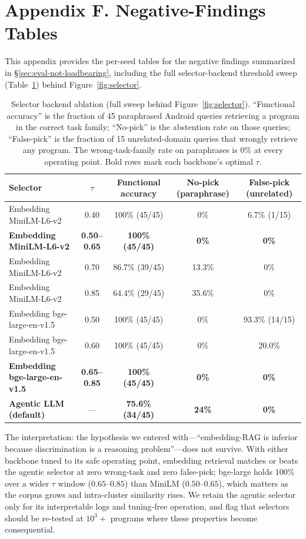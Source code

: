 \documentclass[11pt]{article}
\begin{document}
\section*{Appendix F. Negative-Findings Tables}
\label{sec:eval-selector-ablation}

This appendix provides the per-seed tables for the negative findings summarized in \S\ref{sec:eval-not-loadbearing}, including the full selector-backend threshold sweep (Table~\ref{tab:selector-ablation}) behind Figure~\ref{fig:selector}.

\begin{table}[h]
\centering
\caption{Selector backend ablation (full sweep behind Figure~\ref{fig:selector}). ``Functional accuracy'' is the fraction of 45 paraphrased Android queries retrieving a program in the correct task family; ``No-pick'' is the abstention rate on those queries; ``False-pick'' is the fraction of 15 unrelated-domain queries that wrongly retrieve any program. The wrong-task-family rate on paraphrases is $0\%$ at every operating point. Bold rows mark each backbone's optimal $\tau$.}
\label{tab:selector-ablation}
\footnotesize
\setlength{\tabcolsep}{5pt}
\begin{tabular}{@{}lcccc@{}}
\toprule
Selector & $\tau$ & Functional accuracy & No-pick (paraphrase) & False-pick (unrelated) \\
\midrule
Embedding MiniLM-L6-v2 & 0.40 & 100\% (45/45) & 0\% & 6.7\% (1/15) \\
\textbf{Embedding MiniLM-L6-v2} & \textbf{0.50--0.65} & \textbf{100\% (45/45)} & \textbf{0\%} & \textbf{0\%} \\
Embedding MiniLM-L6-v2 & 0.70 & 86.7\% (39/45) & 13.3\% & 0\% \\
Embedding MiniLM-L6-v2 & 0.85 & 64.4\% (29/45) & 35.6\% & 0\% \\
\midrule
Embedding bge-large-en-v1.5 & 0.50 & 100\% (45/45) & 0\% & 93.3\% (14/15) \\
Embedding bge-large-en-v1.5 & 0.60 & 100\% (45/45) & 0\% & 20.0\% \\
\textbf{Embedding bge-large-en-v1.5} & \textbf{0.65--0.85} & \textbf{100\% (45/45)} & \textbf{0\%} & \textbf{0\%} \\
\midrule
\textbf{Agentic LLM (default)} & --- & \textbf{75.6\% (34/45)} & \textbf{24\%} & \textbf{0\%} \\
\bottomrule
\end{tabular}
\end{table}

The interpretation: the hypothesis we entered with---``embedding-RAG is inferior because discrimination is a reasoning problem''---does not survive. With either backbone tuned to its safe operating point, embedding retrieval matches or beats the agentic selector at zero wrong-task and zero false-pick; bge-large holds $100\%$ over a wider $\tau$ window ($0.65$--$0.85$) than MiniLM ($0.50$--$0.65$), which matters as the corpus grows and intra-cluster similarity rises. We retain the agentic selector only for its interpretable logs and tuning-free operation, and flag that selectors should be re-tested at $10^3{+}$ programs where these properties become consequential.
\end{document}
